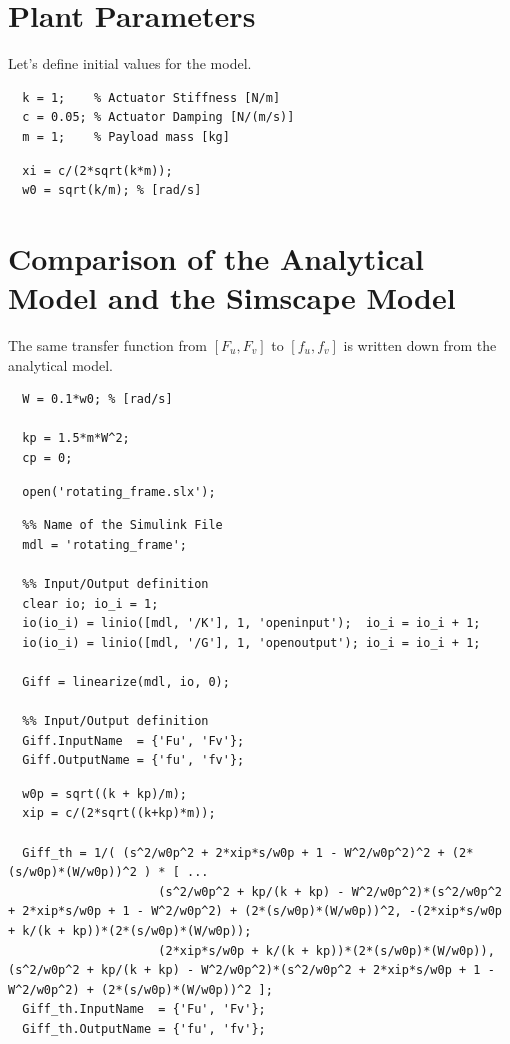\documentclass[a4paper, 10pt, DIV=12, parskip=full]{scrreprt}
\begin{document}
\section{Plant Parameters}
\label{sec:orga1e1958}
Let's define initial values for the model.
\begin{verbatim}
  k = 1;    % Actuator Stiffness [N/m]
  c = 0.05; % Actuator Damping [N/(m/s)]
  m = 1;    % Payload mass [kg]
\end{verbatim}

\begin{verbatim}
  xi = c/(2*sqrt(k*m));
  w0 = sqrt(k/m); % [rad/s]
\end{verbatim}

\section{Comparison of the Analytical Model and the Simscape Model}
\label{sec:orgbea84d1}
The same transfer function from \([F_u, F_v]\) to \([f_u, f_v]\) is written down from the analytical model.
\begin{verbatim}
  W = 0.1*w0; % [rad/s]

  kp = 1.5*m*W^2;
  cp = 0;
\end{verbatim}

\begin{verbatim}
  open('rotating_frame.slx');
\end{verbatim}

\begin{verbatim}
  %% Name of the Simulink File
  mdl = 'rotating_frame';

  %% Input/Output definition
  clear io; io_i = 1;
  io(io_i) = linio([mdl, '/K'], 1, 'openinput');  io_i = io_i + 1;
  io(io_i) = linio([mdl, '/G'], 1, 'openoutput'); io_i = io_i + 1;

  Giff = linearize(mdl, io, 0);

  %% Input/Output definition
  Giff.InputName  = {'Fu', 'Fv'};
  Giff.OutputName = {'fu', 'fv'};
\end{verbatim}

\begin{verbatim}
  w0p = sqrt((k + kp)/m);
  xip = c/(2*sqrt((k+kp)*m));

  Giff_th = 1/( (s^2/w0p^2 + 2*xip*s/w0p + 1 - W^2/w0p^2)^2 + (2*(s/w0p)*(W/w0p))^2 ) * [ ...
                     (s^2/w0p^2 + kp/(k + kp) - W^2/w0p^2)*(s^2/w0p^2 + 2*xip*s/w0p + 1 - W^2/w0p^2) + (2*(s/w0p)*(W/w0p))^2, -(2*xip*s/w0p + k/(k + kp))*(2*(s/w0p)*(W/w0p));
                     (2*xip*s/w0p + k/(k + kp))*(2*(s/w0p)*(W/w0p)), (s^2/w0p^2 + kp/(k + kp) - W^2/w0p^2)*(s^2/w0p^2 + 2*xip*s/w0p + 1 - W^2/w0p^2) + (2*(s/w0p)*(W/w0p))^2 ];
  Giff_th.InputName  = {'Fu', 'Fv'};
  Giff_th.OutputName = {'fu', 'fv'};
\end{verbatim}
\end{document}
